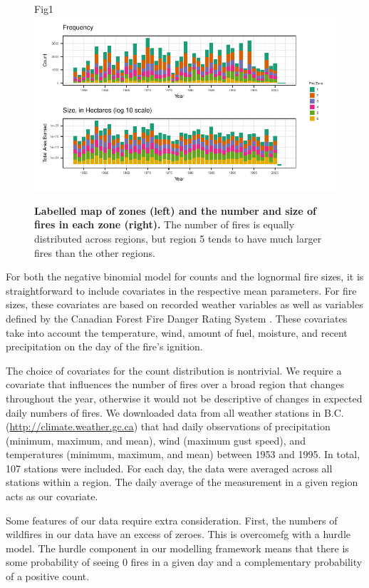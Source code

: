 \documentclass[10pt,letterpaper]{article}
\begin{document}
\begin{figure}[h!]
\centering
Fig1
\includegraphics[width=\textwidth]{Joint_Count_Files/firezones-1.pdf}
\caption{\label{firezones}\textbf{Labelled map of zones (left) and the number
and size of fires in each zone (right).} The number of fires is equally
distributed across regions, but region 5 tends to have much larger fires
than the other regions.}
\end{figure}

For both the negative binomial model for counts and the lognormal fire
sizes, it is straightforward to include covariates in the respective
mean parameters. For fire sizes, these covariates are based on recorded
weather variables as well as variables defined by the Canadian Forest
Fire Danger Rating System \cite{wottonLightningFirePrediction2012}.
These covariates take into account the temperature, wind, amount of
fuel, moisture, and recent precipitation on the day of the fire's
ignition.

The choice of covariates for the count distribution is nontrivial. We
require a covariate that influences the number of fires over a broad
region that changes throughout the year, otherwise it would not be
descriptive of changes in expected daily numbers of fires. We downloaded
data from all weather stations in B.C.
(\url{http://climate.weather.gc.ca}) that had daily observations of
precipitation (minimum, maximum, and mean), wind (maximum gust speed),
and temperatures (minimum, maximum, and mean) between 1953 and 1995.
In total, 107 stations were included. For each day, the data were
averaged across all stations within a region. The daily average of the
measurement in a given region acts as our covariate.

Some features of our data require extra consideration. First, the
numbers of wildfires in our data have an excess of zeroes. This is overcomefg
with a hurdle model. The hurdle component in our modelling framework means that there is some probability of
seeing 0 fires in a given day and a complementary probability of a positive count.
\end{document}

